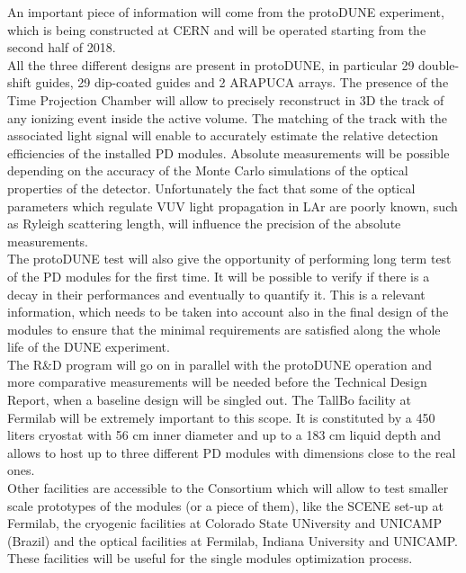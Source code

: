 An important piece of information will come from the protoDUNE experiment, 
which is being constructed at CERN and will be operated starting from the 
second half of 2018.\\
All the three different designs are present in protoDUNE, in particular 29 
double-shift guides, 29 dip-coated guides and 2 ARAPUCA arrays. The 
presence of the Time Projection Chamber will allow to precisely reconstruct 
in 3D the track of any ionizing event inside the active volume. The 
matching of the track with the associated light signal will enable to 
accurately estimate the relative detection efficiencies of the installed PD 
modules. 
Absolute measurements will be possible depending on the accuracy of the
Monte Carlo simulations of the optical properties of the detector. 
Unfortunately the fact that  some of the optical parameters which 
regulate VUV light propagation in LAr are poorly known, such as Ryleigh 
scattering length, will influence the precision of the absolute 
measurements.\\
The protoDUNE test will also give the opportunity of performing long 
term test of the PD modules for the first time. It will be possible to 
verify if there is a decay in their performances and eventually to 
quantify it. This is a relevant information, which needs to be taken into 
account also in the final design of the modules to ensure that the 
minimal requirements are satisfied along the whole life of the DUNE 
experiment.\\

The R\&D program will go on in parallel with the protoDUNE operation and 
more comparative measurements will be needed before the Technical Design 
Report, when a baseline design will be singled out.
The TallBo facility at Fermilab will be extremely important to this scope. 
It is constituted by a 450 liters cryostat with 56 cm inner diameter and up 
to a 183 cm liquid depth and allows to host up to three different PD 
modules with dimensions close to the real ones.\\
Other facilities are accessible to the Consortium which will allow to test 
smaller scale prototypes of the modules (or a piece of them), like the 
SCENE set-up at Fermilab, the cryogenic facilities at Colorado State 
UNiversity and UNICAMP (Brazil) and the optical facilities at Fermilab, 
Indiana University and UNICAMP. These facilities will be useful for the 
single modules optimization process.
         


